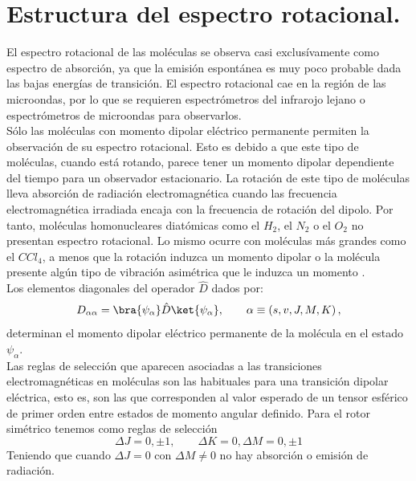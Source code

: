 \documentclass[a4paper]{article}
\begin{document}
\section{Estructura del espectro rotacional.}
El espectro rotacional de las moléculas se observa casi exclusívamente como espectro de absorción, ya que la emisión espontánea es muy poco probable dada las bajas energías de transición. El espectro rotacional cae en la región de las microondas, por lo que se requieren espectrómetros del infrarojo lejano o espectrómetros de microondas para observarlos.\cite{haken2013}\\

Sólo las moléculas con momento dipolar eléctrico permanente permiten la observación de su espectro rotacional.  Esto es debido a que este tipo de moléculas, cuando está rotando, parece tener un momento dipolar dependiente del tiempo para un observador estacionario. La rotación de este tipo de moléculas lleva absorción de radiación electromagnética cuando las frecuencia electromagnética irradiada encaja con la frecuencia de rotación del dipolo. Por tanto, moléculas homonucleares diatómicas como el $H_2$, el $N_2$ o el $O_2$ no presentan espectro rotacional. Lo mismo ocurre con moléculas más grandes como el $CCl_4$, a menos que la rotación induzca un momento dipolar o la molécula presente algún tipo de vibración asimétrica que le induzca un momento \cite{haken2013}.\\
 
Los elementos diagonales del operador $\hat D$ dados por:
\begin{equation}
D_{\alpha\alpha}=\bra{\psi_\alpha}\hat D\ket{\psi_\alpha},\qquad \alpha \equiv \left(s,v,J,M,K\right),
\end{equation}
determinan el momento dipolar eléctrico permanente de la molécula en el estado $\psi_\alpha$.\\

Las reglas de selección que aparecen asociadas a las transiciones electromagnéticas en moléculas son las habituales para una transición dipolar eléctrica, esto es, son las que corresponden al valor esperado de un tensor esférico de primer orden entre estados de momento angular definido.
Para el rotor simétrico tenemos como reglas de selección
\begin{equation}
\Delta J = 0,\pm 1, \qquad\Delta K =0, \Delta M = 0, \pm 1
\end{equation}
Teniendo que cuando $\Delta J = 0$ con $\Delta M \neq 0$ no hay absorción o emisión de radiación.\\
\end{document}
